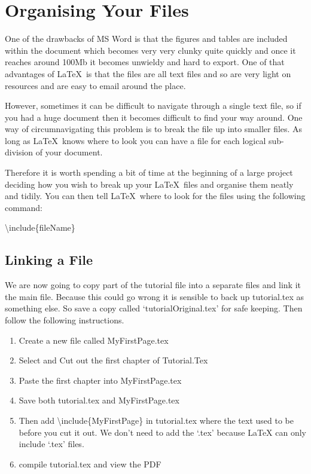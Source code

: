 \chapter{Organising Your Files}
One of the drawbacks of MS Word is that the figures and tables are included within the document which becomes very very clunky quite quickly and once it reaches around 100Mb it becomes unwieldy and hard to export. One of that advantages of \LaTeX\ is that the files are all text files and so are very light on resources and are easy to email around the place.

However, sometimes it can be difficult to navigate through a single text file, so if you had a huge document then it becomes difficult to find your way around.  One way of circumnavigating this problem is to break the file up into smaller files. As long as \LaTeX\ knows where to look you can have a file for each logical sub-division of your document.

Therefore it is worth spending a bit of time at the beginning of a large project deciding how you wish to break up your \LaTeX\ files and organise them neatly and tidily.  You can then tell \LaTeX\ where to look for the files using the following command:

\vspace*{2ex}
{\textbackslash}include\{fileName\}
\vspace*{2ex}

\pagebreak
\section{Linking a File}
We are now going to copy part of the tutorial file into a separate files and link it the main file.  Because this could go wrong it is sensible to back up tutorial.tex as something else. So save a copy called `tutorialOriginal.tex' for safe keeping. Then follow the following instructions.

\begin{enumerate}
\item Create a new file called MyFirstPage.tex
\item Select and Cut out the first chapter of Tutorial.Tex
\item Paste the first chapter into MyFirstPage.tex
\item Save both tutorial.tex and MyFirstPage.tex
\item Then add {\textbackslash}include\{MyFirstPage\} in tutorial.tex where the text used to be before you cut it out. We don't need to add the `.tex' because LaTeX can only include `.tex' files.
\item compile tutorial.tex and view the PDF
\end{enumerate}

